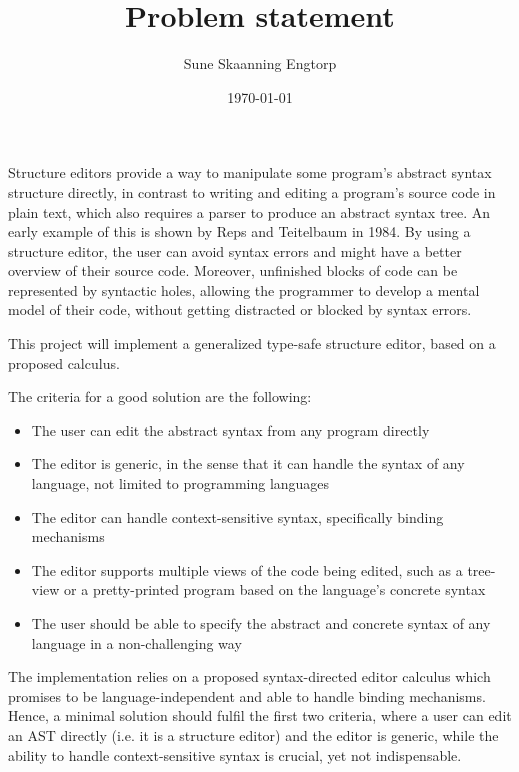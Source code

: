 \documentclass{article}
\title{Problem statement}
\date{\today}
\author{Sune Skaanning Engtorp}
\begin{document}
\maketitle
Structure editors provide a way to manipulate some program's abstract syntax structure directly, in contrast to writing and editing a program's source code in plain text, which also requires a parser to produce an abstract syntax tree. An early example of this is shown by Reps and Teitelbaum\cite{teitelbaum-84} in 1984.
By using a structure editor, the user can avoid syntax errors and might have a better overview of their source code. Moreover, unfinished blocks of code can be represented by syntactic holes, allowing the programmer to develop a mental model of their code, without getting distracted or blocked by syntax errors.

This project will implement a generalized type-safe structure editor, based on a proposed calculus\cite{aalborg}.

The criteria for a good solution are the following:

\begin{itemize}
    \item The user can edit the abstract syntax from any program directly
    \item The editor is generic, in the sense that it can handle the syntax of any language, not limited to programming languages
    \item The editor can handle context-sensitive syntax, specifically binding mechanisms
    \item The editor supports multiple views of the code being edited, such as a tree-view or a pretty-printed program based on the language's concrete syntax
    \item The user should be able to specify the abstract and concrete syntax of any language in a non-challenging way
\end{itemize}

The implementation relies on a proposed syntax-directed editor calculus\cite{aalborg} which promises to be language-independent and able to handle binding mechanisms. Hence, a minimal solution should fulfil the first two criteria, where a user can edit an AST directly (i.e. it is a structure editor) and the editor is generic, while the ability to handle context-sensitive syntax is crucial, yet not indispensable.
\end{document}
